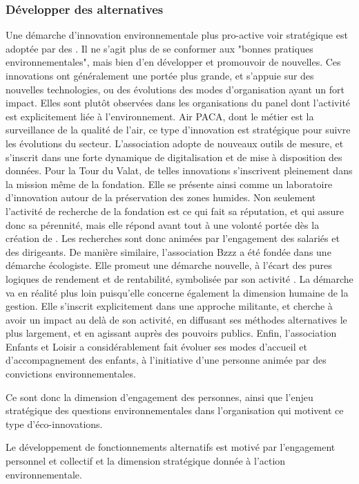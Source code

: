         \subsubsection{Développer des alternatives}
            Une démarche d'innovation environnementale plus pro-active voir stratégique est adoptée par des \oess. Il ne s'agit plus de se conformer aux "bonnes pratiques environnementales", mais bien d'en développer et promouvoir de nouvelles. Ces innovations ont généralement une portée plus grande, et s'appuie sur des nouvelles technologies, ou des évolutions des modes d'organisation ayant un fort impact. Elles sont plutôt observées dans les organisations du panel dont l'activité est explicitement liée à l'environnement. Air PACA, dont le métier est la surveillance de la qualité de l'air, ce type d'innovation est stratégique pour suivre les évolutions du secteur. L'association adopte de nouveaux outils de mesure, et s'inscrit dans une forte dynamique de digitalisation et de mise à disposition des données. Pour la Tour du Valat, de telles innovations s'inscrivent pleinement dans la mission même de la fondation. Elle se présente ainsi comme un laboratoire d'innovation autour de la préservation des zones humides. Non seulement l'activité de recherche de la fondation est ce qui fait sa réputation, et qui assure donc sa pérennité, mais elle répond avant tout à une volonté portée dès la création de . Les recherches sont donc animées par l'engagement des salariés et des dirigeants. De manière similaire, l'association Bzzz a été fondée dans une démarche écologiste. Elle promeut une démarche nouvelle, à l'écart des pures logiques de rendement et de rentabilité, symbolisée par son activité . La démarche va en réalité plus loin puisqu'elle concerne également la dimension humaine de la gestion. Elle s'inscrit explicitement dans une approche militante, et cherche à avoir un impact au delà de son activité, en diffusant ses méthodes alternatives le plus largement, et en agissant auprès des pouvoirs publics. Enfin, l'association Enfants et Loisir a considérablement fait évoluer ses modes d'accueil et d'accompagnement des enfants, à l'initiative d'une personne animée par des convictions environnementales. 
            
            Ce sont donc la dimension d'engagement des personnes, ainsi que l'enjeu stratégique des questions environnementales dans l'organisation qui motivent ce type d'éco-innovations. 
    
            \begin{hyp}
            \label{prop:C}
                Le développement de fonctionnements alternatifs est motivé par l'engagement personnel et collectif et la dimension stratégique donnée à l'action environnementale. 
            \end{hyp}
            
